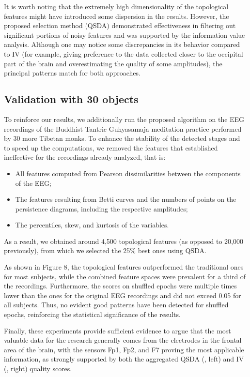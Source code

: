 \documentclass[10pt]{iopart}
\begin{document}
It is worth noting that the extremely high dimensionality of the topological features might have introduced some dispersion in the results. However, the proposed selection method (QSDA) demonstrated effectiveness in filtering out significant portions of noisy features and was supported by the information value analysis. Although one may notice some discrepancies in its behavior compared to IV (for example, giving preference to the data collected closer to the occipital part of the brain and overestimating the quality of some amplitudes), the principal patterns match for both approaches.

\subsection{Validation with 30 objects}

To reinforce our results, we additionally run the proposed algorithm on the EEG recordings of the Buddhist Tantric Guhyasamaja meditation practice performed by 30 more Tibetan monks. To enhance the stability of the detected stages and to speed up the computations, we removed the features that established ineffective for the recordings already analyzed, that is:
\begin{itemize}
    \item 
        All features computed from Pearson dissimilarities between the components of the EEG;\@
    \item 
        The features resulting from Betti curves and the numbers of points on the persistence diagrams, including the respective amplitudes;
    \item 
        The percentiles, skew, and kurtosis of the variables.
\end{itemize}

As a result, we obtained around 4,500 topological features (as opposed to 20,000 previously), from which we selected the 25\% best ones using QSDA.\@

As shown in Figure 8, the topological features outperformed the traditional ones for most subjects, while the combined feature spaces were prevalent for a third of the recordings. Furthermore, the scores on shuffled epochs were multiple times lower than the ones for the original EEG recordings and did not exceed 0.05 for all subjects. Thus, no evident good patterns have been detected for shuffled epochs, reinforcing the statistical significance of the results.

Finally, these experiments provide sufficient evidence to argue that the most valuable data for the research generally comes from the electrodes in the frontal area of the brain, with the sensors Fp1, Fp2, and F7 proving the most applicable information, as strongly supported by both the aggregated QSDA (, left) and IV (, right) quality scores.
\end{document}

